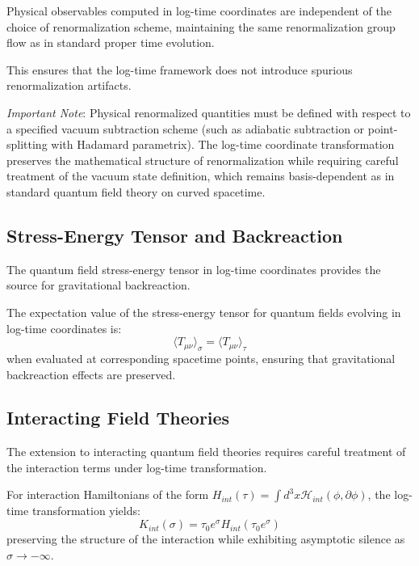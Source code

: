 \begin{theorem}
\label{thm:renormalization_independence}
Physical observables computed in log-time coordinates are independent of the choice of renormalization scheme, maintaining the same renormalization group flow as in standard proper time evolution.
\end{theorem}

This ensures that the log-time framework does not introduce spurious renormalization artifacts.

\emph{Important Note}: Physical renormalized quantities must be defined with respect to a specified vacuum subtraction scheme (such as adiabatic subtraction or point-splitting with Hadamard parametrix). The log-time coordinate transformation preserves the mathematical structure of renormalization while requiring careful treatment of the vacuum state definition, which remains basis-dependent as in standard quantum field theory on curved spacetime.

\subsection{Stress-Energy Tensor and Backreaction}
\label{subsec:stress_energy_backreaction}

The quantum field stress-energy tensor in log-time coordinates provides the source for gravitational backreaction.

\begin{theorem}
\label{thm:stress_energy_log_time}
The expectation value of the stress-energy tensor for quantum fields evolving in log-time coordinates is:
\begin{equation}
\langle T_{\mu\nu} \rangle_{\sigma} = \langle T_{\mu\nu} \rangle_{\tau}
\end{equation}
when evaluated at corresponding spacetime points, ensuring that gravitational backreaction effects are preserved.
\end{theorem}

\subsection{Interacting Field Theories}
\label{subsec:interacting_fields}

The extension to interacting quantum field theories requires careful treatment of the interaction terms under log-time transformation.

\begin{theorem}
\label{thm:interaction_hamiltonian}
For interaction Hamiltonians of the form $H_{int}(\tau) = \int d^3x \mathcal{H}_{int}(\phi, \partial\phi)$, the log-time transformation yields:
\begin{equation}
K_{int}(\sigma) = \tau_0 e^\sigma H_{int}(\tau_0 e^\sigma)
\end{equation}
preserving the structure of the interaction while exhibiting asymptotic silence as $\sigma \to -\infty$.
\end{theorem}

